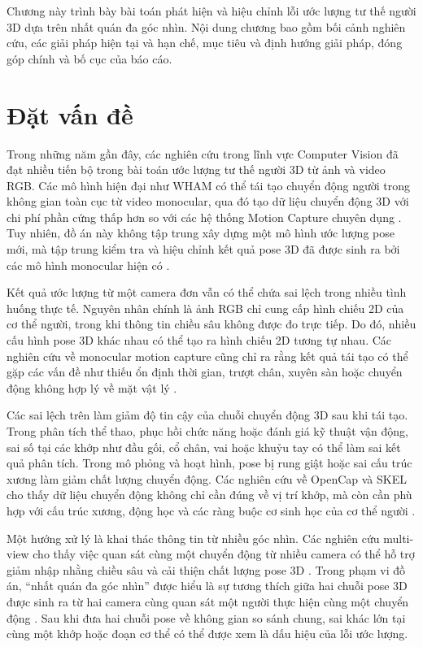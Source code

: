 \documentclass[../DoAn.tex]{subfiles}
\begin{document}
Chương này trình bày bài toán phát hiện và hiệu chỉnh lỗi ước lượng tư thế người 3D dựa trên nhất quán đa góc nhìn. Nội dung chương bao gồm bối cảnh nghiên cứu, các giải pháp hiện tại và hạn chế, mục tiêu và định hướng giải pháp, đóng góp chính và bố cục của báo cáo.

\section{Đặt vấn đề}
\label{sec:dvd}

Trong những năm gần đây, các nghiên cứu trong lĩnh vực Computer Vision đã đạt nhiều tiến bộ trong bài toán ước lượng tư thế người 3D từ ảnh và video RGB. Các mô hình hiện đại như WHAM có thể tái tạo chuyển động người trong không gian toàn cục từ video monocular, qua đó tạo dữ liệu chuyển động 3D với chi phí phần cứng thấp hơn so với các hệ thống Motion Capture chuyên dụng \cite{shin2024wham}. Tuy nhiên, đồ án này không tập trung xây dựng một mô hình ước lượng pose mới, mà tập trung kiểm tra và hiệu chỉnh kết quả pose 3D đã được sinh ra bởi các mô hình monocular hiện có \cite{vu2026multiperspective}.

Kết quả ước lượng từ một camera đơn vẫn có thể chứa sai lệch trong nhiều tình huống thực tế. Nguyên nhân chính là ảnh RGB chỉ cung cấp hình chiếu 2D của cơ thể người, trong khi thông tin chiều sâu không được đo trực tiếp. Do đó, nhiều cấu hình pose 3D khác nhau có thể tạo ra hình chiếu 2D tương tự nhau. Các nghiên cứu về monocular motion capture cũng chỉ ra rằng kết quả tái tạo có thể gặp các vấn đề như thiếu ổn định thời gian, trượt chân, xuyên sàn hoặc chuyển động không hợp lý về mặt vật lý \cite{shin2024wham,physcap2020}.

Các sai lệch trên làm giảm độ tin cậy của chuỗi chuyển động 3D sau khi tái tạo. Trong phân tích thể thao, phục hồi chức năng hoặc đánh giá kỹ thuật vận động, sai số tại các khớp như đầu gối, cổ chân, vai hoặc khuỷu tay có thể làm sai kết quả phân tích. Trong mô phỏng và hoạt hình, pose bị rung giật hoặc sai cấu trúc xương làm giảm chất lượng chuyển động. Các nghiên cứu về OpenCap và SKEL cho thấy dữ liệu chuyển động không chỉ cần đúng về vị trí khớp, mà còn cần phù hợp với cấu trúc xương, động học và các ràng buộc cơ sinh học của cơ thể người \cite{uhlrich2023opencap,keller2023skin}.

Một hướng xử lý là khai thác thông tin từ nhiều góc nhìn. Các nghiên cứu multi-view cho thấy việc quan sát cùng một chuyển động từ nhiều camera có thể hỗ trợ giảm nhập nhằng chiều sâu và cải thiện chất lượng pose 3D \cite{gu2024multiview}. Trong phạm vi đồ án, “nhất quán đa góc nhìn” được hiểu là sự tương thích giữa hai chuỗi pose 3D được sinh ra từ hai camera cùng quan sát một người thực hiện cùng một chuyển động \cite{vu2026multiperspective}. Sau khi đưa hai chuỗi pose về không gian so sánh chung, sai khác lớn tại cùng một khớp hoặc đoạn cơ thể có thể được xem là dấu hiệu của lỗi ước lượng.
\end{document}
